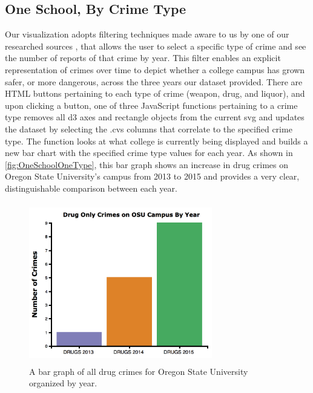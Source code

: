 \documentclass[journal]{vgtc}                %
\begin{document}
\subsection{One School, By Crime Type}
Our visualization adopts filtering techniques made aware to us by one of our researched sources \cite{ kogan_2013 }, that allows the user to select a specific type of crime and see the number of reports of that crime by year.  This filter enables an explicit representation of crimes over time to depict whether a college campus has grown safer, or more dangerous, across the three years our dataset provided. There are HTML buttons pertaining to each type of crime (weapon, drug, and liquor), and upon clicking a button, one of three JavaScript functions pertaining to a crime type removes all d3 axes and rectangle objects from the current svg and updates the dataset by selecting the .cvs columns that correlate to the specified crime type. The function looks at what college is currently being displayed and builds a new bar chart with the specified crime type values for each year. As shown in \autoref{fig:OneSchoolOneType}, this bar graph shows an increase in drug crimes on Oregon State University's campus from 2013 to 2015 and provides a very clear, distinguishable comparison between each year.
\begin{figure}[H]
\label{fig:OneSchoolOneType} 
\includegraphics[width=8cm, height=7cm]{OneSchoolOneType}
\caption{A bar graph of all drug crimes for Oregon State University organized by year.}
\end{figure}
\end{document}
